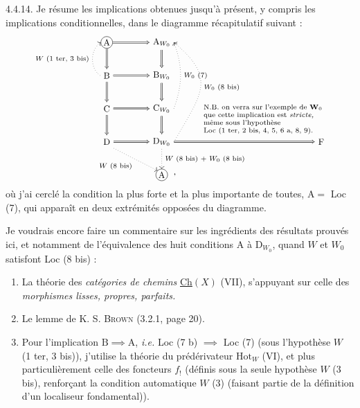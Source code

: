 \documentclass[11pt]{article}
\newcommand{\msp}[1]{\marginpar{\footnotesize [#1]}}
\begin{document}
\noindent\msp{page 63}%
4.4.14. Je résume les implications obtenues jusqu'à présent, y compris les implications conditionnelles, dans le diagramme récapitulatif suivant :
\[
\begin{tikzpicture}[baseline=(C.base),font=\small]
\node[draw,circle,inner sep=1pt] (A) at (0,0) {$\mathrm A$};
\node (AW) at (2,0) {$\mathrm A_{W_0}$};
\node (B) at (0,-1.2) {$\mathrm B$};
\node (BW) at (2,-1.2) {$\mathrm B_{W_0}$};
\node (C) at (0,-2.4) {$\mathrm C$};
\node (CW) at (2,-2.4) {$\mathrm C_{W_0}$};
\node (D) at (0,-3.6) {$\mathrm D$};
\node (DW) at (2,-3.6) {$\mathrm D_{W_0}$};
\node (F) at (7.8,-3.6) {$\mathrm F$};
\node[draw,circle,inner sep=1pt] (Ab) at (2,-4.8) {$\mathrm A$};
\node[anchor=west] at (2.25,-4.8) {$\,,$};
\foreach \p/\q in {A/AW,B/BW,C/CW,D/DW,A/B,B/C,C/D,AW/BW,BW/CW,CW/DW,DW/F}
  \draw[double,double distance=1pt,-{Implies}] (\p) -- (\q);
\draw[dotted,->] (B.west) to[out=145,in=215] node[left,font=\scriptsize] {$W$ (1 ter, 3 bis)} (A.west);
\draw[dotted,->] (CW.east) to[out=70,in=-70] node[right,font=\scriptsize] {$W_0$ (7)} (AW.east);
\draw[dotted,->] (DW.east) to[out=60,in=-40,looseness=1.45] node[right,font=\scriptsize] {$W_0$ (8 bis)} (AW.east);
\draw[dotted,->] (D.south east) -- node[below left,font=\scriptsize] {$W$ (8 bis)} (Ab.north west);
\draw[dotted,->] (DW) -- node[right,font=\scriptsize] {$W$ (8 bis) $+$ $W_0$ (8 bis)} (Ab);
\node[anchor=south west,align=left,font=\scriptsize] at (3.4,-3.45) {N.B. on verra sur l'exemple de $\mathbf{W}_0$\\
que cette implication est \textit{stricte,}\\
même sous l'hypothèse\\
Loc (1 ter, 2 bis, 4, 5, 6 a, 8, 9).};
\end{tikzpicture}
\]
où j'ai cerclé la condition la plus forte et la plus importante de toutes, $\mathrm{A}=$ Loc (7), qui apparaît en deux extrémités opposées du diagramme.

Je voudrais encore faire un commentaire sur les ingrédients des résultats prouvés ici, et notamment de l'équivalence des huit conditions A à $\mathrm{D}_{W_0}$, quand $W$ et $W_0$ satisfont Loc (8 bis) :

\msp{page 64}%
\begin{enumerate}[leftmargin=2.5em]
\item[1)] La théorie des \textit{catégories de chemins} \underline{Ch}$(X)$ (VII), s'appuyant sur celle des \textit{morphismes lisses, propres, parfaits.}
\item[2)] Le lemme de K. S. \textsc{Brown} (3.2.1, page 20).
\item[3)] Pour l'implication $\mathrm{B}\implies\mathrm{A}$, \textit{i.e.} Loc (7 b) $\implies$ Loc (7) (sous l'hypothèse $W$ (1 ter, 3 bis)), j'utilise la théorie du prédérivateur $\mathrm{Hot}_W$ (VI), et plus particulièrement celle des foncteurs $f_!$ (définis sous la seule hypothèse $W$ (3 bis), renforçant la condition automatique $W$ (3) (faisant partie de la définition d'un localiseur fondamental)).
\end{enumerate}
\end{document}
